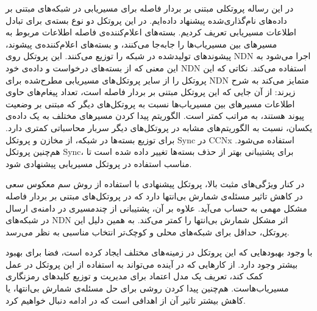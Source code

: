 
در این رساله پروتکلی مبتنی بر بردار فاصله برای مسیریابی در شبکه‌های مبتنی بر داده‌های نام‌گذاری‌شده پیشنهاد داده‌ایم. در این پروتکل دو نوع بسته‌ی برای تبادل اطلاعات مسیریابی تعریف کردیم. بسته‌های اعلام‌کننده‌ی فاصله اطلاعات مربوط به مسیرهای بین مسیریاب‌ها را جابه‌جا می‌کنند، و بسته‌های اعلام‌کننده‌ی پیشوند، پیشوند‌های تولید‌شده در شبکه را توزیع می‌کنند. این پروتکل روی NDN اجرا می‌شود به این معنی که از بسته‌های درخواست و داده‌ی خود NDN استفاده می‌کند. نکاتی که این پروتکل را از سایر پروتکل‌های مسیریابی مطرح‌شده برای NDN متمایز می‌کند به شرح زیرند:
 از آن جایی که این پروتکل مبتنی بر بردار فاصله است، تعداد پیغام‌های حاوی اطلاعات مسیرهای بین مسیریاب‌ها نسبت به پروتکل‌های دیگر که مبتنی بر وضعیت پیوند هستند، به مراتب کمتر است. 
 الگوریتم پیدا کردن مسیرهای مختلف به یک داده‌ی یکسان، نسبت به الگوریتم‌های مشابه در پروتکل‌های دیگر سربار محاسباتی کمتری دارد.
 برای توزیع بسته‌ها در شبکه، از مخازن و پروتکل Sync در CCNx استفاده می‌شود. هم‌چنین پروتکل Sync، برای پشتیبانی بهتر از حذف بسته‌ها تغییر داده شده است تا مناسب استفاده در پروتکل مسیریابی پیشنهادی شود.

در کنار ویژگی‌های مثبت بالا، پروتکل پیشنهادی با استفاده از روش سم معکوس سعی در کاهش تاثیر مسئله‌ی شمارش بی‌انتها دارد که در پروتکل‌های مبتنی بر بردار فاصله مشکل مهمی به حساب می‌آید. علاوه بر آن، پشتیبانی از چندمسیری در دامنه‌ی ارسال در شبکه‌های NDN اثر مشکل شمارش بی‌انتها را کمتر می‌کند. به همین دلیل این پروتکل، حداقل برای شبکه‌های محلی و کوچک‌تر انتخاب مناسبی به نظر می‌رسد.

با وجود بهبودهایی که این پروتکل در زمینه‌های مختلف ایجاد کرده است، فضا برای بهبود بیشتر وجود دارد. از کارهایی که در آینده می‌تواند به استفاده از این پروتکل در عمل کمک کند، تعریف یک مدل اعتماد برای مدیریت و توزیع کلید‌های رمزنگاری مسیریاب‌هاست. هم‌چنین پیدا کردن روشی برای حل مسئله‌ی شمارش بی‌انتها، یا کاهش بیشتر تاثیر آن از اهدافی است که در ادامه دنبال خواهیم کرد.

